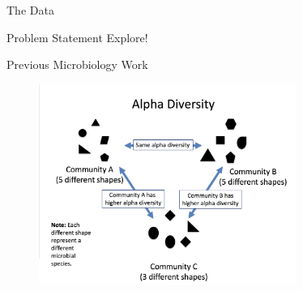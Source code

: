 \documentclass{beamer}
\begin{document}
\begin{frame}{The Data}
\begin{figure}%
    \centering
    \qquad
    \label{fig:example}%
\end{figure}
\end{frame}

\begin{frame}{Problem Statement}
  \centering Explore!
\end{frame}

\begin{frame}{Previous Microbiology Work}
  \begin{figure}%
    \centering \includegraphics[width=0.75\textwidth]{diversity.png}
  \end{figure}
\end{frame}
 
\end{document}
